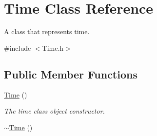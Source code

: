 \hypertarget{class_time}{\section{Time Class Reference}
\label{class_time}
}


A class that represents time.  




{\ttfamily \#include $<$Time.\+h$>$}

\subsection*{Public Member Functions}
\begin{DoxyCompactItemize}
\item 
\hypertarget{class_time_a4245e409c7347d1d671858962c2ca3b5}{\hyperlink{class_time_a4245e409c7347d1d671858962c2ca3b5}{Time} ()}\label{class_time_a4245e409c7347d1d671858962c2ca3b5}

\begin{DoxyCompactList}\small\item\em The time class object constructor. \end{DoxyCompactList}\item 
\hypertarget{class_time_a1e92dbe963fa3cdd6bea207680f5f6d1}{\hyperlink{class_time_a1e92dbe963fa3cdd6bea207680f5f6d1}{$\sim$\+Time} ()}\label{class_time_a1e92dbe963fa3cdd6bea207680f5f6d1}


\end{DoxyCompactItemize}
